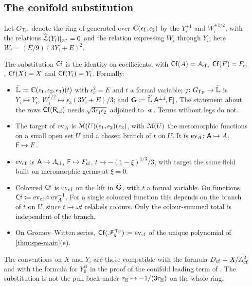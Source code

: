 \subsection{The conifold substitution}

Let $G_{\mathsf{T}_{\mathrm{F}}}$ denote the ring of \cite{BS} generated over $\mathbb{C}(\epsilon_1,\epsilon_2)$ by the $Y_i^{\pm1}$ and $W_i^{\pm1/2}$, with the relations $\widehat{\mathcal{L}}(Y_i)|_{\alpha^*}=0$ and the relation expressing $W_i$ through $Y_i$; here $W_i=(E/9)(3Y_i+E)^2$.

\begin{defn}
\label{def:fra-cf}
The substitution $\mathsf{Cf}$ is the identity on coefficients, with $\mathsf{Cf}(A)=A_{\mathrm{cf}}$, $\mathsf{Cf}(F)=F_{\mathrm{cf}}$, $\mathsf{Cf}(X)=X$ and $\mathsf{Cf}(Y_i)=Y_i$. Formally:
\begin{itemize}
\item $\widetilde{\mathbb{L}}\coloneqq\mathbb{C}(\epsilon_1,\epsilon_2,\epsilon_3)(t)$ with $\epsilon_3^2=E$ and $t$ a formal variable; $\jmath\colon G_{\mathsf{T}_{\mathrm{F}}}\to\widetilde{\mathbb{L}}$ is $Y_i\mapsto Y_i$, $W_i^{1/2}\mapsto\epsilon_3(3Y_i+E)/3$; and $\mathbf{G}\coloneqq\widetilde{\mathbb{L}}[\mathsf{A}^{\pm1},\mathsf{F}]$. The statement about the rows $\mathsf{Cf}(\mathsf{R}_{ai})$ needs $\sqrt{3\epsilon_1\epsilon_2}$ adjoined to $\Lt$. Terms without legs do not.
\item The target of $\mathrm{ev}_{A}$ is $\mathcal{M}(U)(\epsilon_1,\epsilon_2)(\epsilon_3)$, with $\mathcal{M}(U)$ the meromorphic functions on a small open set $U$ and a chosen branch of $t$ on $U$. It is $\mathrm{ev}_{A}\colon\mathsf{A}\mapsto A$, $\mathsf{F}\mapsto F$.
\item $\mathrm{ev}_{\mathrm{cf}}$ is $\mathsf{A}\mapsto A_{\mathrm{cf}}$, $\mathsf{F}\mapsto F_{\mathrm{cf}}$, $t\mapsto-(1-\xi)^{1/3}/3$, with target the same field built on meromorphic germs at $\xi=0$.
\item Coloured $\mathsf{Cf}$ is $\mathrm{ev}_{\mathrm{cf}}$ on the lift in $\mathbf{G}$, with $t$ a formal variable. On functions, $\mathsf{Cf}\coloneqq\mathrm{ev}_{\mathrm{cf}}\circ\mathrm{ev}_{A}^{-1}$. For a single coloured function this depends on the branch of $t$ on $U$, since $t\mapsto\omega t$ relabels colours. Only the colour-summed total is independent of the branch.
\item On Gromov--Witten series, $\mathsf{Cf}(\mathscr{F}_g^{\mathsf{T}_{\mathrm{F}}})\coloneqq\mathrm{ev}_{\mathrm{cf}}$ of the unique polynomial of \cref{thm:spe-main}\textup{(e)}.
\end{itemize}
\end{defn}

\begin{rmk}
\label{rmk:fra-cfread}
The conventions on $X$ and $Y_i$ are those compatible with the formula $D_{\mathrm{cf}}=X/A_{\mathrm{cf}}^2$ and with the formula for $Y_0^{\mathrm{cf}}$ in the proof of the conifold leading term of \cite{BS}. The substitution is not the pull-back under $\tau_{\mathbb{H}}\mapsto-1/(3\tau_{\mathbb{H}})$ on the whole ring.
\end{rmk}

